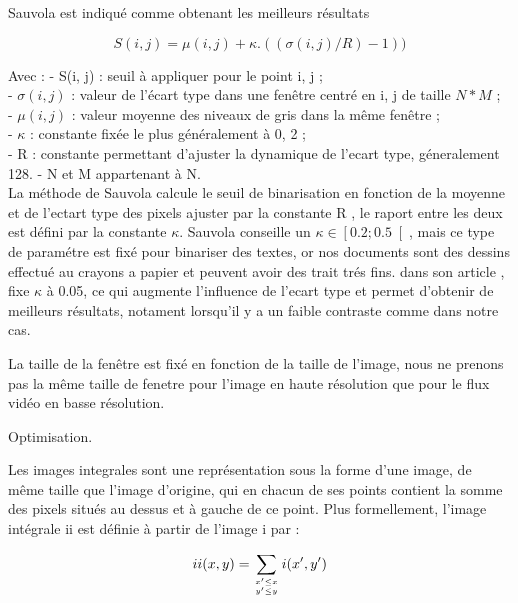 Sauvola est indiqué comme obtenant les meilleurs résultats

\begin{equation}
	S(i,j) = \mu(i,j) + \kappa.((\sigma(i,j)/R)-1))
\end{equation}

Avec :
- S(i, j) : seuil à appliquer pour le point i, j ;\\
- $\sigma(i, j)$ : valeur de l’écart type dans une fenêtre centré en i, j de taille $N * M$ ;\\
- $\mu(i, j)$ : valeur moyenne des niveaux de gris dans la même fenêtre ;\\
- $\kappa$ : constante fixée le plus généralement à 0, 2 ;\\
- R : constante permettant d'ajuster la dynamique de l'ecart type, géneralement 128.
- N et M appartenant à N.\\

La méthode de Sauvola calcule le seuil de binarisation en fonction de la moyenne et de l'ectart type des pixels ajuster par la constante R , le raport entre les deux est défini par la constante $\kappa$.
Sauvola conseille un $\kappa \in \left[ 0.2 ;0.5 \right[$, mais ce type de paramétre est fixé pour binariser des textes, or nos documents sont des dessins effectué au crayons a papier et peuvent avoir des trait trés fins.
dans son article  , fixe $\kappa$ à 0.05, ce qui augmente l'influence de l'ecart type et permet d'obtenir de meilleurs résultats, notament lorsqu'il y a un faible contraste comme dans notre cas.   

La taille de la fenêtre est fixé en fonction de la taille de l'image, nous ne prenons pas la même taille de fenetre pour l'image en haute résolution que pour le flux vidéo en basse résolution.

Optimisation.

Les images integrales sont une représentation sous la forme d'une image, de même taille que l'image d'origine, qui en chacun de ses points contient la somme des pixels situés au dessus et à gauche de ce point. Plus formellement, l'image intégrale ii est définie à partir de l'image i par : 

\begin{equation}
	ii(x,y) = \sum_{x' \leq x  \atop y' \leq y } i(x',y')
\end{equation}

